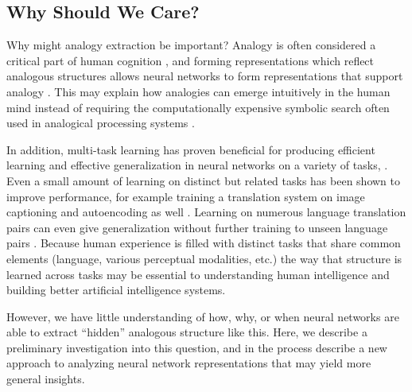 \documentclass[10pt,letterpaper]{article}
\begin{document}
\subsection{Why Should We Care?}
Why might analogy extraction be important? Analogy is often considered a critical part of human cognition \cite[e.g.]{Gentner2003}, and forming representations which reflect analogous structures allows neural networks to form representations that support analogy \citep{Pennington2014,Kollias2013}. This may explain how analogies can emerge intuitively in the human mind instead of requiring the computationally expensive symbolic search often used in analogical processing systems \cite[e.g.]{Falkenhainer1989}. \par
In addition, multi-task learning has proven beneficial for producing efficient learning and effective generalization in neural networks on a variety of tasks, \cite[e.g.]{Dong2015,Rusu2015}. Even a small amount of learning on distinct but related tasks has been shown to improve performance, for example training a translation system on image captioning and autoencoding as well \citep{Luong2016}. Learning on numerous language translation pairs can even give generalization without further training to unseen language pairs \citep{Johnson2016a}. Because human experience is filled with distinct tasks that share common elements (language, various perceptual modalities, etc.) the way that structure is learned across tasks may be essential to understanding human intelligence and building better artificial intelligence systems.\par
However, we have little understanding of how, why, or when neural networks are able to extract ``hidden'' analogous structure like this. Here, we describe a preliminary investigation into this question, and in the process describe a new approach to analyzing neural network representations that may yield more general insights. 
\end{document}
